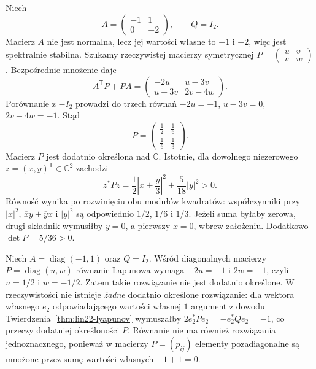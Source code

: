 \begin{przyklad}
\label{prz:lin22-non-normal}
Niech
\[
 A=\begin{pmatrix}-1&1\\0&-2\end{pmatrix},
 \qquad Q=I_2.
\]
Macierz \(A\) nie jest normalna,
lecz jej wartości własne
to \(-1\) i \(-2\),
więc jest spektralnie stabilna.
Szukamy rzeczywistej
macierzy symetrycznej
\(P=\begin{pmatrix}u&v\\v&w\end{pmatrix}\).
Bezpośrednie mnożenie daje
\[
 A^{\mathsf T}P+PA
 =\begin{pmatrix}
   -2u&u-3v\\
   u-3v&2v-4w
  \end{pmatrix}.
\]
Porównanie z \(-I_2\)
prowadzi do trzech równań
\(-2u=-1\), \(u-3v=0\),
\(2v-4w=-1\).
Stąd
\[
 P=\begin{pmatrix}
 \frac12&\frac16\\
 \frac16&\frac13
 \end{pmatrix}.
\]
Macierz \(P\) jest dodatnio określona
nad \(\mathbb C\). Istotnie,
dla dowolnego niezerowego
\(z=(x,y)^{\mathsf T}\in\mathbb C^2\)
zachodzi
\[
 z^*Pz
 =\frac12\left|x+\frac y3\right|^2
  +\frac5{18}|y|^2>0.
\]
Równość wynika po rozwinięciu
obu modułów kwadratów:
współczynniki przy
\(|x|^2\), \(\overline{x}y+\overline{y}x\)
i \(|y|^2\) są odpowiednio
\(1/2\), \(1/6\) i \(1/3\).
Jeżeli suma byłaby zerowa,
drugi składnik wymusiłby \(y=0\),
a pierwszy \(x=0\), wbrew założeniu.
Dodatkowo \(\det P=5/36>0\).
\end{przyklad}

\begin{przyklad}
\label{prz:lin22-unstable}
Niech
\(A=\operatorname{diag}(-1,1)\)
oraz \(Q=I_2\).
Wśród diagonalnych macierzy
\(P=\operatorname{diag}(u,w)\)
równanie Lapunowa wymaga
\(-2u=-1\) i \(2w=-1\),
czyli \(u=1/2\) i \(w=-1/2\).
Zatem takie rozwiązanie
nie jest dodatnio określone.
W rzeczywistości nie istnieje
\emph{żadne} dodatnio określone
rozwiązanie: dla wektora własnego
\(e_2\) odpowiadającego wartości
własnej \(1\) argument z dowodu
Twierdzenia~\ref{thm:lin22-lyapunov}
wymuszałby
\(2e_2^*Pe_2=-e_2^*Qe_2=-1\),
co przeczy dodatniej określoności \(P\).
Równanie nie ma również rozwiązania
jednoznacznego, ponieważ
w macierzy \(P=(p_{ij})\)
elementy pozadiagonalne
są mnożone przez sumę
wartości własnych \(-1+1=0\).
\end{przyklad}

